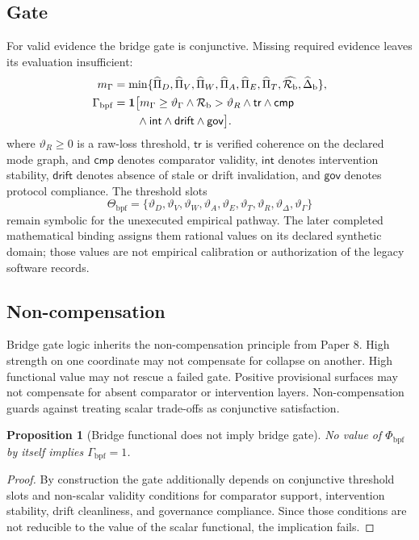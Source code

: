 \documentclass[11pt,a4paper]{article}
\newtheorem{proposition}[theorem]{Proposition}
\theoremstyle{definition}
\newcommand{\PhiBridge}{\Phi_{\mathrm{bpf}}}
\newcommand{\GateBridge}{\Gamma_{\mathrm{bpf}}}
\newcommand{\BridgeMargin}{\mathcal{R}_{\mathrm{b}}}
\newcommand{\Thresholds}{\Theta_{\mathrm{bpf}}}
\begin{document}
\subsection{Gate}
For valid evidence the bridge gate is conjunctive. Missing required evidence leaves its evaluation insufficient:
\begin{align*}
 m_\Gamma
 &=\min\{\widehat{\Pi}_D,\widehat{\Pi}_V,\widehat{\Pi}_W,\widehat{\Pi}_A,
          \widehat{\Pi}_E,\widehat{\Pi}_T,\widehat{\BridgeMargin},\widehat{\Delta}_{\mathrm b}\},\\
 \GateBridge
 &=\mathbf1\bigl[m_\Gamma\ge\vartheta_\Gamma
 \land\BridgeMargin>\vartheta_R\land\mathsf{tr}\land\mathsf{cmp}\\
 &\hphantom{=\mathbf1\bigl[}\land\mathsf{int}\land\mathsf{drift}\land\mathsf{gov}\bigr].
\end{align*}
where $\vartheta_R\ge0$ is a raw-loss threshold, $\mathsf{tr}$ is verified coherence on the declared mode graph, and $\mathsf{cmp}$ denotes comparator validity, $\mathsf{int}$ denotes intervention stability, $\mathsf{drift}$ denotes absence of stale or drift invalidation, and $\mathsf{gov}$ denotes protocol compliance. The threshold slots
\[
\Thresholds=
\{\vartheta_D,\vartheta_V,\vartheta_W,\vartheta_A,\vartheta_E,\vartheta_T,\vartheta_R,\vartheta_\Delta,\vartheta_{\Gamma}\}
\]
remain symbolic for the unexecuted empirical pathway. The later completed
mathematical binding assigns them rational values on its declared synthetic
domain; those values are not empirical calibration or authorization of the
legacy software records.

\subsection{Non-compensation}
Bridge gate logic inherits the non-compensation principle from Paper 8. High strength on one coordinate may not compensate for collapse on another. High functional value may not rescue a failed gate. Positive provisional surfaces may not compensate for absent comparator or intervention layers. Non-compensation guards against treating scalar trade-offs as conjunctive satisfaction.

\begin{proposition}[Bridge functional does not imply bridge gate]
No value of $\PhiBridge$ by itself implies $\GateBridge=1$.
\end{proposition}

\begin{proof}
By construction the gate additionally depends on conjunctive threshold slots and non-scalar validity conditions for comparator support, intervention stability, drift cleanliness, and governance compliance. Since those conditions are not reducible to the value of the scalar functional, the implication fails.
\end{proof}
\end{document}
